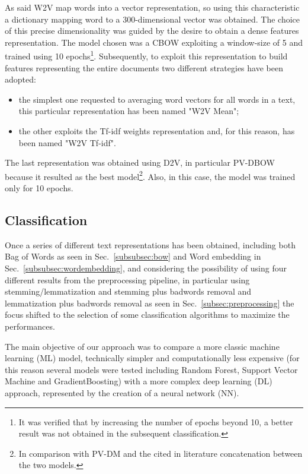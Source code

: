 \documentclass[10pt]{article}
\begin{document}
As said W2V map words into a vector representation, so using this characteristic a dictionary mapping word to a 300-dimensional vector was obtained. 
The choice of this precise dimensionality was guided by the desire to obtain a dense features representation.
The model chosen was a CBOW exploiting a window-size of 5 and trained using 10 epochs\footnote{It was verified that by increasing the number of epochs beyond 10, a better result was not obtained in the subsequent classification.}.
Subsequently, to exploit this representation to build features representing the entire documents two different strategies have been adopted:
\begin{itemize}
\item the simplest one requested to averaging word vectors for all words in a text, this particular representation has been named "W2V Mean";
\item the other exploits the Tf-idf weights representation and, for this reason, has been named "W2V Tf-idf".
\end{itemize} 

The last representation was obtained using D2V, in particular PV-DBOW because it resulted as the best model\footnote{In comparison with PV-DM and the cited in literature concatenation between the two models.}. 
Also, in this case, the model was trained only for 10 epochs. 
\subsection{Classification \label{subsec: classification}}
Once a series of different text representations has been obtained, including both Bag of Words as seen in Sec.~\ref{subsubsec:bow} and Word embedding in Sec.~\ref{subsubsec:wordembedding}, and considering the possibility of using four different results from the preprocessing pipeline, in particular using stemming/lemmatization and stemming plus badwords removal and lemmatization plus badwords removal as seen in Sec.~\ref{subsec:preprocessing} the focus shifted to the selection of some classification algorithms to maximize the performances.

The main objective of our approach was to compare a more classic machine learning (ML) model, technically simpler and computationally less expensive (for this reason several models were tested including Random Forest, Support Vector Machine and GradientBoosting) with a more complex deep learning (DL) approach, represented by the creation of a neural network (NN).
\end{document}
